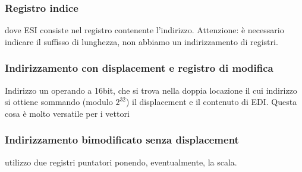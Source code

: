 \documentclass[11pt]{report}
\theoremstyle{definition}
\begin{document}
 \subsubsection*{Registro indice} 
 \noindent dove ESI consiste nel registro contenente l'indirizzo. Attenzione: è necessario indicare il suffisso di lunghezza, non abbiamo un indirizzamento di registri.
 \subsubsection*{Indirizzamento con displacement e registro di modifica}
 \noindent Indirizzo un operando a 16bit, che si trova nella doppia locazione il cui indirizzo si ottiene sommando (modulo $2^{32}$) il displacement e il contenuto di EDI. Questa cosa è molto versatile per i vettori
 \subsubsection*{Indirizzamento bimodificato senza displacement}
 \noindent utilizzo due registri puntatori ponendo, eventualmente, la scala.
 
\end{document}
